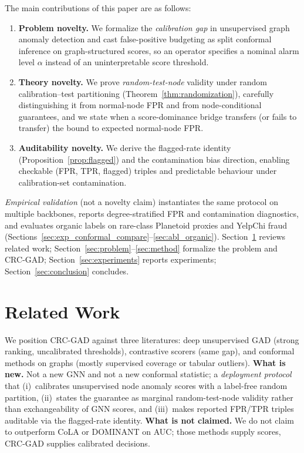 \documentclass[a4paper]{cas-dc}
\theoremstyle{definition}
\begin{document}
The main contributions of this paper are as follows:
\begin{enumerate}
  \item \textbf{Problem novelty.} We formalize the \emph{calibration gap} in unsupervised graph anomaly detection and cast false-positive budgeting as split conformal inference on graph-structured scores, so an operator specifies a nominal alarm level $\alpha$ instead of an uninterpretable score threshold.
  \item \textbf{Theory novelty.} We prove \emph{random-test-node} validity under random calibration--test partitioning (Theorem~\ref{thm:randomization}), carefully distinguishing it from normal-node FPR and from node-conditional guarantees, and we state when a score-dominance bridge transfers (or fails to transfer) the bound to expected normal-node FPR.
  \item \textbf{Auditability novelty.} We derive the flagged-rate identity (Proposition~\ref{prop:flagged}) and the contamination bias direction, enabling checkable (FPR, TPR, flagged) triples and predictable behaviour under calibration-set contamination.
\end{enumerate}
\noindent\emph{Empirical validation} (not a novelty claim) instantiates the same protocol on multiple backbones, reports degree-stratified FPR and contamination diagnostics, and evaluates organic labels on rare-class Planetoid proxies and YelpChi fraud (Sections~\ref{sec:exp_conformal_compare}--\ref{sec:abl_organic}).
Section~\ref{sec:related} reviews related work; Section~\ref{sec:problem}--\ref{sec:method} formalize the problem and CRC-GAD; Section~\ref{sec:experiments} reports experiments; Section~\ref{sec:conclusion} concludes.

\section{Related Work}
\label{sec:related}

We position CRC-GAD against three literatures: deep unsupervised GAD (strong ranking, uncalibrated thresholds), contrastive scorers (same gap), and conformal methods on graphs (mostly supervised coverage or tabular outliers).
\textbf{What is new.} Not a new GNN and not a new conformal statistic; a \emph{deployment protocol} that (i)~calibrates unsupervised node anomaly scores with a label-free random partition, (ii)~states the guarantee as marginal random-test-node validity rather than exchangeability of GNN scores, and (iii)~makes reported FPR/TPR triples auditable via the flagged-rate identity.
\textbf{What is not claimed.} We do not claim to outperform CoLA or DOMINANT on AUC; those methods supply scores, CRC-GAD supplies calibrated decisions.
\end{document}
